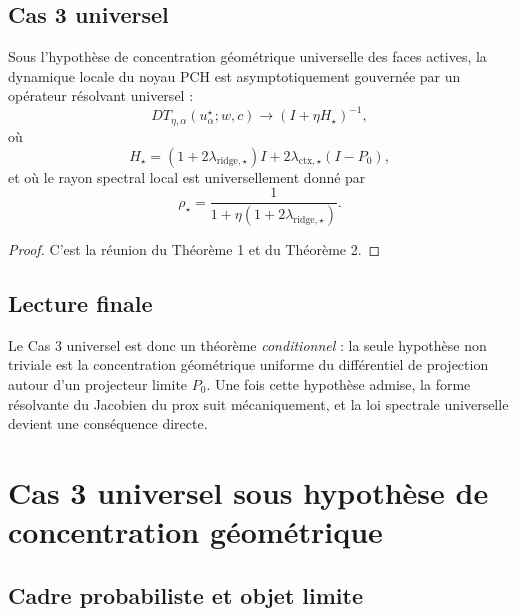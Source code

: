 \subsection{Cas 3 universel}

\begin{theorem}
Sous l'hypothèse de concentration géométrique universelle des faces actives, la dynamique locale du noyau PCH est asymptotiquement gouvernée par un opérateur résolvant universel :
\[
DT_{\eta,\alpha}(u_\alpha^\star;w,c)
\to
(I+\eta H_\star)^{-1},
\]
où
\[
H_\star
=
(1+2\lambda_{\mathrm{ridge},\star})I
+
2\lambda_{\mathrm{ctx},\star}(I-P_0),
\]
et où le rayon spectral local est universellement donné par
\[
\rho_\star
=
\frac{1}{1+\eta(1+2\lambda_{\mathrm{ridge},\star})}.
\]
\end{theorem}

\begin{proof}
C'est la réunion du Théorème 1 et du Théorème 2.
\end{proof}

\subsection{Lecture finale}

Le Cas 3 universel est donc un théorème \emph{conditionnel} :
la seule hypothèse non triviale est la concentration géométrique uniforme du différentiel de projection autour d'un projecteur limite \(P_0\).  
Une fois cette hypothèse admise, la forme résolvante du Jacobien du prox suit mécaniquement, et la loi spectrale universelle devient une conséquence directe.





\section{Cas 3 universel sous hypothèse de concentration géométrique}

\subsection{Cadre probabiliste et objet limite}

